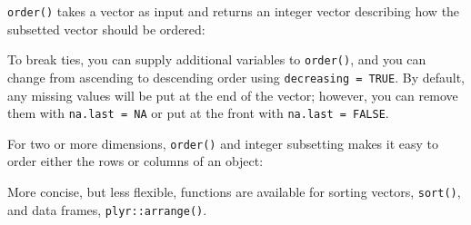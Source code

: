 \texttt{order()} takes a vector as input and returns an integer vector
describing how the subsetted vector should be ordered: 

\begin{Shaded}
\begin{Highlighting}[]
\StringTok{ }\NormalTok{(}\NormalTok{, }\NormalTok{, }\NormalTok{)}
\NormalTok{x[}\NormalTok{(x)]}
\end{Highlighting}
\end{Shaded}

To break ties, you can supply additional variables to \texttt{order()},
and you can change from ascending to descending order using
\texttt{decreasing = TRUE}. By default, any missing values will be put
at the end of the vector; however, you can remove them with
\texttt{na.last = NA} or put at the front with \texttt{na.last = FALSE}.

For two or more dimensions, \texttt{order()} and integer subsetting
makes it easy to order either the rows or columns of an object:

\begin{Shaded}
\begin{Highlighting}[]
\StringTok{ }\NormalTok{df[}\NormalTok{(}\NormalTok{:}\NormalTok{]}

\NormalTok{df2[}\NormalTok{(df2$x), ]}
\NormalTok{df2[, }\NormalTok{(}\NormalTok{(df2))]}
\end{Highlighting}
\end{Shaded}

More concise, but less flexible, functions are available for sorting
vectors, \texttt{sort()}, and data frames, \texttt{plyr::arrange()}.

